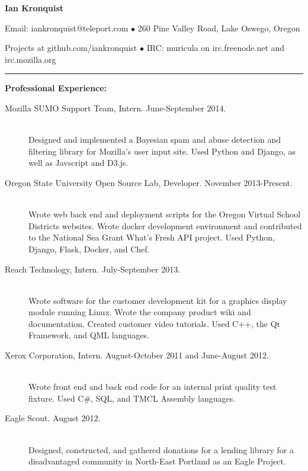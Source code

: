 \documentclass[11pt]{article}
\begin{document}
\centerline{{\LARGE \bf Ian Kronquist}}

\bigskip

\centerline{
	Email: iankronquist@teleport.com
	$\bullet$
	260 Pine Valley Road, Lake Oswego, Oregon
}
\centerline{
	Projects at github.com/iankronquist
	$\bullet$
        IRC: muricula on irc.freenode.net and irc.mozilla.org
}


\bigskip

\hrule

\bigskip

{\Large \bf Professional Experience:}
\normalsize
\begin{description}
	\item[Mozilla SUMO Support Team, Intern.
		\hfill June-September 2014.]
		\hfill \\
		Designed and implemented a Bayesian spam and abuse detection and
		filtering library for Mozilla's user input site.
		Used Python and Django, as well as Javscript and D3.js.

	\item[Oregon State University Open Source Lab, Developer.
		\hfill November 2013-Present.]
		\hfill \\
		Wrote web back end and deployment scripts for the
		Oregon Virtual School Districts websites. 
		Wrote docker development environment and contributed to the
		National Sea Grant What's Fresh API project.
		Used Python, Django, Flask, Docker, and Chef.

	\item[Reach Technology, Intern.
		\hfill July-September 2013.]
		\hfill \\
		Wrote software for the customer development kit for a graphics
		display module running Linux. Wrote the company product wiki 
		and documentation. Created customer video tutorials. Used C++,
		the Qt Framework, and QML languages.

	\item[Xerox Corporation, Intern.
		\hfill  August-October 2011 and June-August 2012.]
		\hfill \\
		Wrote front end and back end code for an internal print quality
		test fixture.
		Used C\#, SQL, and TMCL Assembly languages.

	\item[Eagle Scout.
		\hfill August 2012.]
		\hfill \\
		Designed, constructed, and gathered donations for a lending library
		for a disadvantaged community in North-East Portland as an Eagle
		Project.
\end{description}
\end{document}
